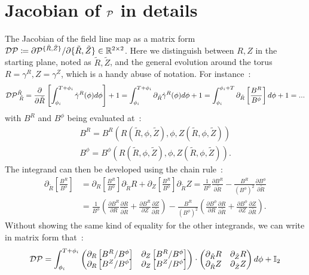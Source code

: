 \section{Jacobian of $\mathcal{P}$ in details}
The Jacobian of the field line map as a matrix form $\mathcal{D}\mathcal{P} \coloneqq \partial \mathcal{P}^{\{\tilde{R},\tilde{Z}\}}/{\partial \{\tilde{R},\tilde{Z}\}} \in \mathbb{R}^{2\times2}$. Here we distinguish between $R,Z$ in the starting plane, noted as $\tilde{R},\tilde{Z}$, and the general evolution around the torus $R = \gamma^R, Z = \gamma^Z$, which is a handy abuse of notation. For instance~:
\begin{align*}
    \mathcal{D}\mathcal{P}^{\tilde{R}}_{\,\:\tilde{R}} = \frac{\partial}{\partial \tilde{R}}\left[\int_{\phi_i}^{T+\phi_i}\dot{\gamma}^R(\phi)d\phi\right] + 1 = \int_{\phi_i}^{T+\phi_i}\partial_{\tilde{R}}\dot{\gamma}^R(\phi)d\phi + 1 = \int_{\phi_i}^{\phi_i+T}\partial_{\tilde{R}}\left[\frac{B^R}{B^\phi}\right]d\phi + 1 = ...
\end{align*}
with $B^R$ and $B^\phi$ being evaluated at~:
\begin{align*}
  B^R = B^R(R(\tilde{R}, \phi, \tilde{Z}), \phi, Z(\tilde{R}, \phi, \tilde{Z}))\\
    B^\phi = B^\phi(R(\tilde{R}, \phi, \tilde{Z}), \phi, Z(\tilde{R}, \phi, \tilde{Z})).
\end{align*}
The integrand can then be developed using the chain rule~:
\begin{align*}
    \partial_{\tilde{R}}\left[\frac{B^R}{B^\phi}\right] &= \partial_{R}\left[\frac{B^R}{B^\phi}\right]\partial_{\tilde{R}}R + \partial_{Z}\left[\frac{B^R}{B^\phi}\right]\partial_{\tilde{R}}Z = \frac{1}{B^\phi}\frac{\partial B^R}{\partial\tilde{R}} - \frac{B^R}{(B^\phi)^2}\frac{\partial B^\phi}{\partial\tilde{R}} \\&= \frac{1}{B^\phi}\left(\frac{\partial B^R}{\partial R}\frac{\partial R}{\partial\tilde{R}}+\frac{\partial B^R}{\partial Z}\frac{\partial Z}{\partial\tilde{R}}\right) - \frac{B^R}{(B^\phi)^2}\left(\frac{\partial B^\phi}{\partial R}\frac{\partial R}{\partial\tilde{R}}+\frac{\partial B^\phi}{\partial Z}\frac{\partial Z}{\partial\tilde{R}}\right).
\end{align*}
Without showing the same kind of equality for the other integrands, we can write in matrix form that~:
\begin{align*}
    \mathcal{D}\mathcal{P} = \int_{\phi_i}^{T+\phi_i}\begin{pmatrix}
        \partial_{R}\left[B^R/B^\phi\right] & \partial_{Z}\left[B^R/B^\phi\right]\\
        \partial_{R}\left[B^Z/B^\phi\right] & \partial_{Z}\left[B^Z/B^\phi\right]
    \end{pmatrix}\cdot\begin{pmatrix}
        \partial_{\tilde{R}}R & \partial_{\tilde{Z}}R\\
        \partial_{\tilde{R}}Z & \partial_{\tilde{Z}}Z
    \end{pmatrix}d\phi + \mathbb{I}_2
\end{align*}

